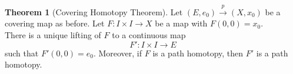 \documentclass[12pt]{article}
\theoremstyle{definition}
\newtheorem{thm}{Theorem}
\numberwithin{thm}{section}
\begin{document}
\begin{thm}[Covering Homotopy Theorem]
	Let $(E, e_0) \overset{p}{\longrightarrow} (X, x_0)$ be a covering map as before. Let $F:I \times I \to X$ be a map with $F(0, 0) = x_0.$\\
	There is a unique lifting of $F$ to a continuous map
	\begin{equation*} 
		F':I \times I \to E
	\end{equation*}
	such that $F'(0, 0) = e_0.$ Moreover, if $F$ is a path homotopy, then $F'$ is a path homotopy.
\end{thm} 
\end{document}
